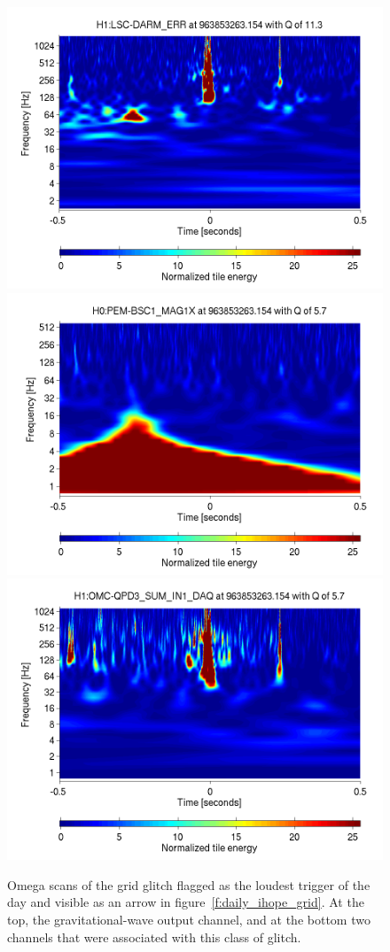 \begin{figure}
  \includegraphics[width=\linewidth]{figures/detchar/963853263_154296875_H1_LSC-DARM_ERR_1_00_spectrogram_whitened}
  \includegraphics[width=0.5\linewidth]{figures/detchar/963853263_154296875_H0_PEM-BSC1_MAG1X_1_00_spectrogram_whitened}
  \includegraphics[width=0.5\linewidth]{figures/detchar/963853263_154296875_H1_OMC-QPD3_SUM_IN1_DAQ_1_00_spectrogram_whitened}
  \caption[Grid glitches in omega]{
  \label{f:omega_grid}
Omega scans of the grid glitch flagged as the loudest trigger of the
day and visible as an arrow in figure~\ref{f:daily_ihope_grid}.  At
the top, the gravitational-wave output channel, and at the bottom two
channels that were associated with this class of glitch.
}
\end{figure}%


